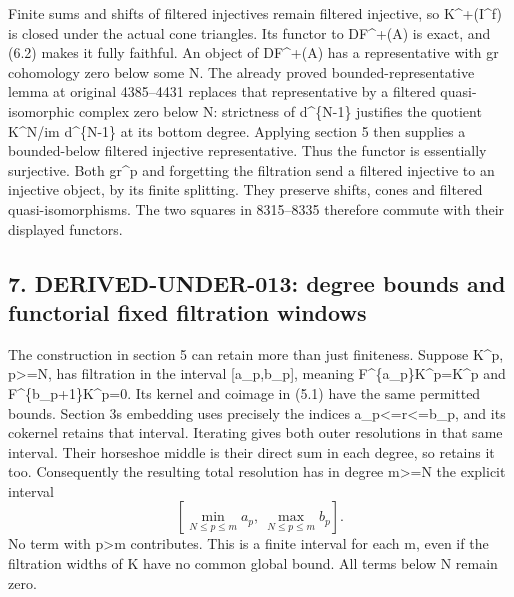 \documentclass[11pt]{article}
\begin{document}
Finite sums and shifts of filtered injectives remain filtered injective,\allowbreak{} so K\textasciicircum{}\allowbreak{}+(I\textasciicircum{}f)\allowbreak{} is closed under the actual cone triangles. Its functor to DF\textasciicircum{}\allowbreak{}+(A)\allowbreak{} is exact,\allowbreak{} and (6.2)\allowbreak{} makes it fully faithful. An object of DF\textasciicircum{}\allowbreak{}+(A)\allowbreak{} has a representative with gr cohomology zero below some N. The already proved bounded-representative lemma at original 4385–\allowbreak{}4431 replaces that representative by a filtered quasi-isomorphic complex zero below N:\allowbreak{} strictness of d\^{}\{N-1\} justifies the quotient K\textasciicircum{}N/\allowbreak{}im d\^{}\{N-1\} at its bottom degree. Applying section 5 then supplies a bounded-below filtered injective representative. Thus the functor is essentially surjective. Both gr\^{}p and forgetting the filtration send a filtered injective to an injective object,\allowbreak{} by its finite splitting. They preserve shifts,\allowbreak{} cones and filtered quasi-isomorphisms. The two squares in 8315–\allowbreak{}8335 therefore commute with their displayed functors.

\subsection{\texorpdfstring{7. DERIVED-UNDER-013:\allowbreak{} degree bounds and functorial fixed filtration windows}{7.  degree bounds and functorial fixed filtration windows}}\label{proofs-7589-8350-derived-under-013-degree-bounds-and-functorial-fixed-filtration-windows}

The construction in section 5 can retain more than just finiteness. Suppose K\textasciicircum{}p,\allowbreak{} p>\allowbreak{}=N,\allowbreak{} has filtration in the interval [a\_\allowbreak{}p,\allowbreak{}b\_\allowbreak{}p]\allowbreak{},\allowbreak{} meaning F\textasciicircum{}\{a\_\allowbreak{}p\}K\textasciicircum{}p\allowbreak{}=K\textasciicircum{}p and F\textasciicircum{}\{b\_\allowbreak{}p\allowbreak{}+1\}K\textasciicircum{}p\allowbreak{}=0. Its kernel and coimage in (5.1)\allowbreak{} have the same permitted bounds. Section 3\textquotesingle s embedding uses precisely the indices a\_\allowbreak{}p<\allowbreak{}=r<\allowbreak{}=b\_\allowbreak{}p,\allowbreak{} and its cokernel retains that interval. Iterating gives both outer resolutions in that same interval. Their horseshoe middle is their direct sum in each degree,\allowbreak{} so retains it too. Consequently the resulting total resolution has in degree m>\allowbreak{}=N the explicit interval \[
 \left[\min_{N\le p\le m}a_p,\
       \max_{N\le p\le m}b_p\right].                         \tag{7.1}
\] No term with p\textgreater m contributes. This is a finite interval for each m,\allowbreak{} even if the filtration widths of K have no common global bound. All terms below N remain zero.
\end{document}
